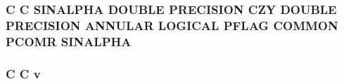 \hypertarget{periodic_8com_a76d1a34bb91d6b27600fc2c1bc9b26fd}{
\subsubsection[{S\-I\-N\-A\-L\-P\-H\-A}]{\setlength{\rightskip}{0pt plus 5cm}C C S\-I\-N\-A\-L\-P\-H\-A D\-O\-U\-B\-L\-E P\-R\-E\-C\-I\-S\-I\-O\-N {\bf C\-Z\-Y} D\-O\-U\-B\-L\-E P\-R\-E\-C\-I\-S\-I\-O\-N {\bf A\-N\-N\-U\-L\-A\-R} L\-O\-G\-I\-C\-A\-L {\bf P\-F\-L\-A\-G} C\-O\-M\-M\-O\-N P\-C\-O\-M\-R S\-I\-N\-A\-L\-P\-H\-A}}\label{periodic_8com_a76d1a34bb91d6b27600fc2c1bc9b26fd}
\hypertarget{periodic_8com_a8961853e9a171af64fe80e35da93a2e0}{
\subsubsection[{v}]{\setlength{\rightskip}{0pt plus 5cm}C C v}}\label{periodic_8com_a8961853e9a171af64fe80e35da93a2e0}
